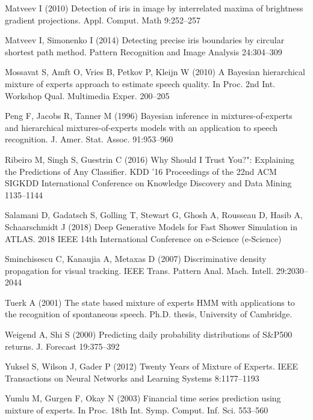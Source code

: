 \begin{thebibliography}{}
Matveev I (2010) Detection of iris in image by interrelated maxima of brightness gradient projections. Appl. Comput. Math 9:252--257

Matveev I, Simonenko I (2014) Detecting precise iris boundaries by circular shortest path method. Pattern Recognition and Image Analysis 24:304--309

Mossavat S, Amft O, Vries B, Petkov P, Kleijn W (2010) A Bayesian hierarchical mixture of experts approach to estimate speech quality. In Proc. 2nd Int. Workshop Qual. Multimedia Exper. 200--205

Peng F, Jacobs R, Tanner M (1996) Bayesian inference in mixtures-of-experts and hierarchical mixtures-of-experts models with an application to speech recognition. J. Amer. Stat. Assoc. 91:953--960

Ribeiro M, Singh S, Guestrin C (2016) Why Should I Trust You?": Explaining the Predictions of Any Classifier. KDD ’16 Proceedings of the 22nd ACM SIGKDD International Conference on Knowledge Discovery and Data Mining 1135--1144

Salamani D, Gadatsch S, Golling T,  Stewart G, Ghosh A,  Rousseau D,  Hasib A,  Schaarschmidt J (2018) Deep Generative Models for Fast Shower Simulation in ATLAS. 2018 IEEE 14th International Conference on e-Science (e-Science) 

Sminchisescu C, Kanaujia A, Metaxas D (2007) Discriminative density propagation for visual tracking. IEEE Trans. Pattern Anal. Mach. Intell. 29:2030--2044

Tuerk A (2001) The state based mixture of experts HMM with applications to the recognition of spontaneous speech. Ph.D. thesis, University of Cambridge.

Weigend A, Shi S (2000) Predicting daily probability distributions of S\&P500 returns. J. Forecast 19:375--392

Yuksel S, Wilson J, Gader P (2012) Twenty Years of Mixture of Experts. IEEE Transactions on Neural Networks and Learning Systems 8:1177--1193

Yumlu M, Gurgen F,  Okay N (2003) Financial time series prediction using mixture of experts. In Proc. 18th Int. Symp. Comput. Inf. Sci. 553--560

\end{thebibliography}



